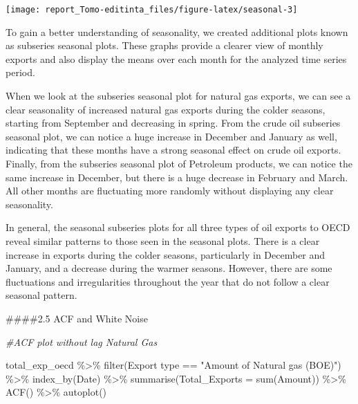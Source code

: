 \documentclass[
]{article}
\newenvironment{Shaded}{\begin{snugshade}}{\end{snugshade}}
\newcommand{\AttributeTok}[1]{\textcolor[rgb]{0.77,0.63,0.00}{#1}}
\newcommand{\CommentTok}[1]{\textcolor[rgb]{0.56,0.35,0.01}{\textit{#1}}}
\newcommand{\FunctionTok}[1]{\textcolor[rgb]{0.00,0.00,0.00}{#1}}
\newcommand{\NormalTok}[1]{#1}
\newcommand{\SpecialCharTok}[1]{\textcolor[rgb]{0.00,0.00,0.00}{#1}}
\newcommand{\StringTok}[1]{\textcolor[rgb]{0.31,0.60,0.02}{#1}}
\begin{document}
\begin{center}\texttt{[image: report\_Tomo-editinta\_files/figure-latex/seasonal-3]} \end{center}

To gain a better understanding of seasonality, we created additional
plots known as subseries seasonal plots. These graphs provide a clearer
view of monthly exports and also display the means over each month for
the analyzed time series period.

When we look at the subseries seasonal plot for natural gas exports, we
can see a clear seasonality of increased natural gas exports during the
colder seasons, starting from September and decreasing in spring. From
the crude oil subseries seasonal plot, we can notice a huge increase in
December and January as well, indicating that these months have a strong
seasonal effect on crude oil exports. Finally, from the subseries
seasonal plot of Petroleum products, we can notice the same increase in
December, but there is a huge decrease in February and March. All other
months are fluctuating more randomly without displaying any clear
seasonality.

In general, the seasonal subseries plots for all three types of oil
exports to OECD reveal similar patterns to those seen in the seasonal
plots. There is a clear increase in exports during the colder seasons,
particularly in December and January, and a decrease during the warmer
seasons. However, there are some fluctuations and irregularities
throughout the year that do not follow a clear seasonal pattern.

\#\#\#\#2.5 ACF and White Noise

\begin{Shaded}
\begin{Highlighting}[]
\CommentTok{\#ACF plot without lag Natural Gas}

\NormalTok{total\_exp\_oecd }\SpecialCharTok{\%\textgreater{}\%} \FunctionTok{filter}\NormalTok{(}\StringTok{\textasciigrave{}}\AttributeTok{Export type}\StringTok{\textasciigrave{}} \SpecialCharTok{==} \StringTok{"Amount of Natural gas (BOE)"}\NormalTok{) }\SpecialCharTok{\%\textgreater{}\%} 
  \FunctionTok{index\_by}\NormalTok{(Date) }\SpecialCharTok{\%\textgreater{}\%} 
  \FunctionTok{summarise}\NormalTok{(}\AttributeTok{Total\_Exports =} \FunctionTok{sum}\NormalTok{(}\StringTok{\textasciigrave{}}\AttributeTok{Amount}\StringTok{\textasciigrave{}}\NormalTok{)) }\SpecialCharTok{\%\textgreater{}\%} 
  \FunctionTok{ACF}\NormalTok{() }\SpecialCharTok{\%\textgreater{}\%}  \FunctionTok{autoplot}\NormalTok{()}
\end{Highlighting}
\end{Shaded}
\end{document}
